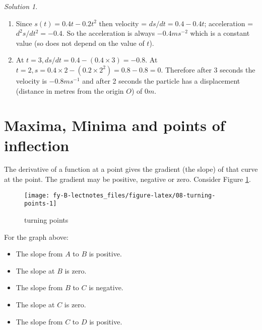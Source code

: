 \documentclass[
  11pt,
  oneside]{book}
\providecommand{\tightlist}{%
  \setlength{\itemsep}{0pt}\setlength{\parskip}{0pt}}
\newcommand{\slide}{}
\theoremstyle{definition}
\theoremstyle{definition}
\theoremstyle{definition}
\theoremstyle{definition}
\theoremstyle{remark}
\newtheorem*{solution}{Solution}
\begin{document}
\begin{solution}
\leavevmode

\begin{enumerate}
\def\labelenumi{\arabic{enumi}.}
\item
  Since \(s(t) = 0.4t-0.2t^2\) then velocity = \(ds/dt = 0.4-0.4t\); acceleration = \(d^2s/dt^2 = -0.4\).
  So the acceleration is always \(-0.4ms^{-2}\) which is a constant value (so does not depend on the value of \(t\)).
\item
  At \(t=3, ds/dt = 0.4-(0.4\times 3) = -0.8\). At \(t=2, s = 0.4\times2-(0.2\times 2^2) = 0.8-0.8 = 0\). Therefore after \(3\) seconds the velocity is \(-0.8ms^{-1}\) and after 2 seconds the particle has a displacement (distance in metres from the origin \(O\)) of \(0m\).
\end{enumerate}

\end{solution}

\slide

\section{Maxima, Minima and points of inflection}\label{lecture-eight}

The derivative of a function at a point gives the gradient (the slope) of that curve at the point. The gradient may be positive, negative or zero. Consider Figure \ref{fig:08-turning-points}.

\begin{figure}

{\centering \texttt{[image: fy-B-lectnotes\_files/figure-latex/08-turning-points-1]} 

}

\caption{turning points}\label{fig:08-turning-points}
\end{figure}

\slide

For the graph above:

\begin{itemize}
\tightlist
\item
  The slope from \(A\) to \(B\) is positive.
\item
  The slope at \(B\) is zero.
\item
  The slope from \(B\) to \(C\) is negative.
\item
  The slope at \(C\) is zero.
\item
  The slope from \(C\) to \(D\) is positive.
\end{itemize}
\end{document}
